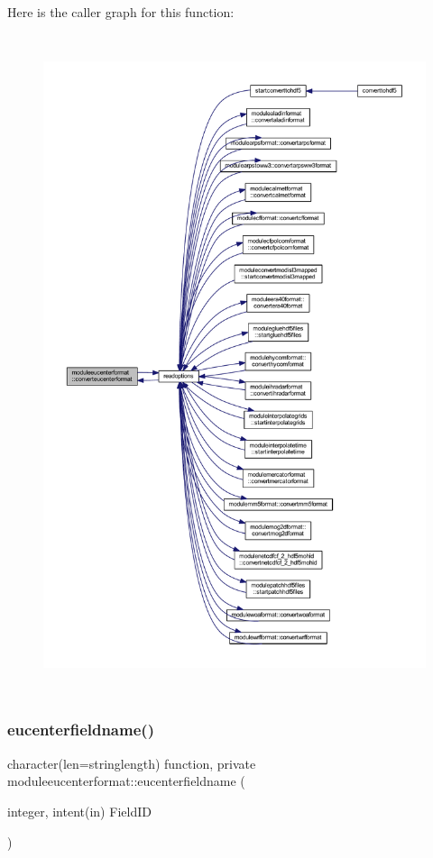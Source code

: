 Here is the caller graph for this function\+:\nopagebreak
\begin{figure}[H]
\begin{center}
\leavevmode
\includegraphics[height=550pt]{namespacemoduleeucenterformat_aa12d33b733be8e990e1050000343f7ed_icgraph}
\end{center}
\end{figure}
\mbox{\label{namespacemoduleeucenterformat_a2270a8364737dc694ff865c8eb8a8788}} 
\subsubsection{\texorpdfstring{eucenterfieldname()}{eucenterfieldname()}}
{\footnotesize\ttfamily character(len=stringlength) function, private moduleeucenterformat\+::eucenterfieldname (\begin{DoxyParamCaption}\item[{integer, intent(in)}]{Field\+ID }\end{DoxyParamCaption})\hspace{0.3cm}{\ttfamily [private]}}

